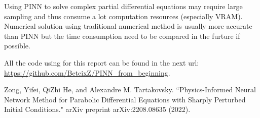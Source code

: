 \documentclass[11pt, a4paper]{article}
\begin{document}
    Using PINN to solve complex partial differential equations may require large sampling and thus consume a lot computation resources (especially VRAM). 
    Numerical solution using traditional numerical method is usually more accurate than PINN but the time consumption need to be compared in the furture if possible. 

    All the code using for this report can be found in the next url: \url{https://github.com/BeteixZ/PINN_from_beginning}.

    \begin{thebibliography}{9}
           Zong, Yifei, QiZhi He, and Alexandre M. Tartakovsky. ``Physics-Informed Neural Network Method for Parabolic Differential Equations with Sharply Perturbed Initial Conditions." arXiv preprint arXiv:2208.08635 (2022).
    \end{thebibliography}
\end{document}
